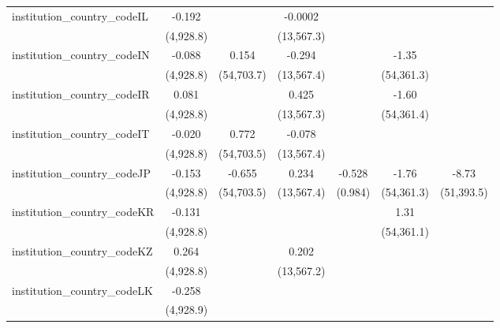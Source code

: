 \begin{tabular}{lcccccc}
   institution\_country\_codeIL          & -0.192        &             & -0.0002       &              &              &   \\   
                                         & (4,928.8)     &             & (13,567.3)    &              &              &   \\   
   institution\_country\_codeIN          & -0.088        & 0.154       & -0.294        &              & -1.35        &   \\   
                                         & (4,928.8)     & (54,703.7)  & (13,567.4)    &              & (54,361.3)   &   \\   
   institution\_country\_codeIR          & 0.081         &             & 0.425         &              & -1.60        &   \\   
                                         & (4,928.8)     &             & (13,567.3)    &              & (54,361.4)   &   \\   
   institution\_country\_codeIT          & -0.020        & 0.772       & -0.078        &              &              &   \\   
                                         & (4,928.8)     & (54,703.5)  & (13,567.4)    &              &              &   \\   
   institution\_country\_codeJP          & -0.153        & -0.655      & 0.234         & -0.528       & -1.76        & -8.73\\   
                                         & (4,928.8)     & (54,703.5)  & (13,567.4)    & (0.984)      & (54,361.3)   & (51,393.5)\\   
   institution\_country\_codeKR          & -0.131        &             &               &              & 1.31         &   \\   
                                         & (4,928.8)     &             &               &              & (54,361.1)   &   \\   
   institution\_country\_codeKZ          & 0.264         &             & 0.202         &              &              &   \\   
                                         & (4,928.8)     &             & (13,567.2)    &              &              &   \\   
   institution\_country\_codeLK          & -0.258        &             &               &              &              &   \\   
                                         & (4,928.9)     &             &               &              &              &   \\   

\end{tabular}
